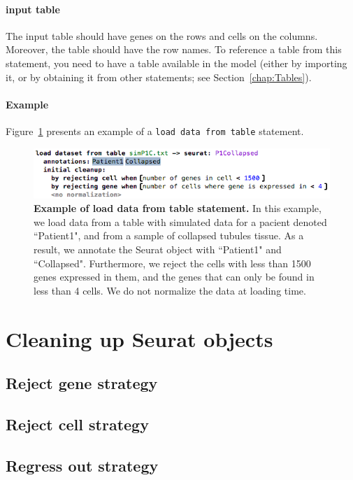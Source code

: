 \paragraph{input table}
The input table should have genes on the rows and cells on the columns.
Moreover, the table should have the row names. To reference a table
from this statement, you need to have a table available in the model (either by importing
it, or by obtaining it from other statements; see Section~\ref{chap:Tables}).

\paragraph{Example} Figure~\ref{fig:ExampleLoadTable} presents an example of a
\texttt{load data from table} statement.

\begin{figure}[h!tbp]
  \centering
  \includegraphics[width=\figWidthWide]{figures/ExampleLoadTable.png}
    \caption[Example of load data from table statement.]{\textbf{Example of load data from table statement.}
    In this example, we load data from a table with simulated data for a pacient
    denoted ``Patient1", and from a sample of collapsed tubules tissue.
    As a result, we annotate the Seurat object with ``Patient1" and
    ``Collapsed". Furthermore, we reject the cells with less than 1500 genes expressed in
    them, and the genes that can only be found in less than 4 cells. We do not normalize
    the data at loading time.} 
\label{fig:ExampleLoadTable}
\end{figure}


\section{Cleaning up Seurat objects}\label{sec:CleanupSeurat}
\subsection{Reject gene strategy}
\subsection{Reject cell strategy}
\subsection{Regress out strategy}
